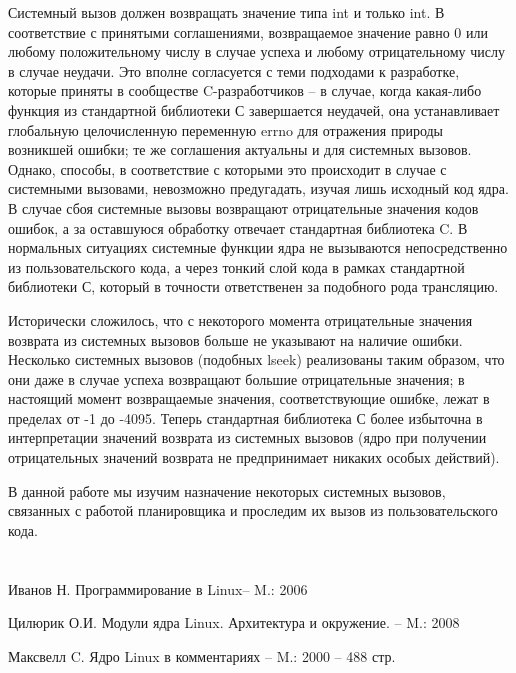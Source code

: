 \documentclass[a4paper, 12pt]{article}		%
\begin{document}
Системный вызов должен возвращать значение типа int и только int. В соответствие с принятыми соглашениями, возвращаемое значение равно 0 или любому положительному числу в случае успеха и любому отрицательному числу в случае неудачи. Это вполне согласуется с теми подходами к разработке, которые приняты в сообществе C-разработчиков -- в случае, когда какая-либо функция из стандартной библиотеки С завершается неудачей, она устанавливает глобальную целочисленную переменную errno для отражения природы возникшей ошибки; те же соглашения актуальны и для системных вызовов. Однако, способы, в соответствие с которыми это происходит в случае с системными вызовами, невозможно предугадать, изучая лишь исходный код ядра. В случае сбоя системные вызовы возвращают отрицательные значения кодов ошибок, а за оставшуюся обработку отвечает стандартная библиотека C. В нормальных ситуациях системные функции ядра не вызываются непосредственно из пользовательского кода, а через тонкий слой кода в рамках стандартной библиотеки С, который в точности ответственен за подобного рода трансляцию\cite{Maxwell}.

Исторически сложилось, что с некоторого момента отрицательные значения возврата из системных вызовов больше не указывают на наличие ошибки. Несколько системных вызовов (подобных lseek) реализованы таким образом, что они даже в случае успеха возвращают большие отрицательные значения; в настоящий момент возвращаемые значения, соответствующие ошибке, лежат в пределах от -1 до -4095. Теперь стандартная библиотека С более избыточна в интерпретации значений возврата из системных вызовов (ядро при получении отрицательных значений возврата не предпринимает никаких особых действий).

В данной работе мы изучим назначение некоторых системных вызовов, связанных с работой планировщика и проследим их вызов из пользовательского кода.



\section*{}

\begin{thebibliography}{00}

Иванов Н. Программирование в Linux-- M.: 2006

Цилюрик О.И. Модули ядра Linux. Архитектура и окружение. -- M.: 2008

Максвелл C. Ядро Linux в комментариях -- M.: 2000 -- 488 стр.


\end{thebibliography}

\end{document}
